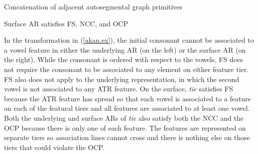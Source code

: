 \documentclass[,doc,floatsintext]{apa6}
\theoremstyle{definition}
\theoremstyle{definition}
\theoremstyle{definition}
\theoremstyle{remark}
\begin{document}
\begin{exe}
\ex \label{concat.ex} Concatenation of adjacent autosegmental graph primitives \\
\end{exe}

\begin{exe}
\ex \label{akan.ex} Surface AR satisfies FS, NCC, and OCP \\
\end{exe}

In the transformation in (\ref{akan.ex}), the initial consonant cannot
be associated to a vowel feature in either the underlying AR (on the
left) or the surface AR (on the right). While the consonant is ordered
with respect to the vowels, FS does not require the consonant to be
associated to any element on either feature tier. FS also does not apply
to the underlying representation, in which the second vowel is not
associated to any ATR feature. On the surface, \emph{tie} satisfies FS
because the ATR feature has spread so that each vowel is associated to a
feature on each of the featural tiers and all features are associated to
at least one vowel. Both the underlying and surface ARs of \emph{tie}
also satisfy both the NCC and the OCP because there is only one of each
feature. The features are represented on separate tiers so association
lines cannot cross and there is nothing else on those tiers that could
violate the OCP.
\end{document}
